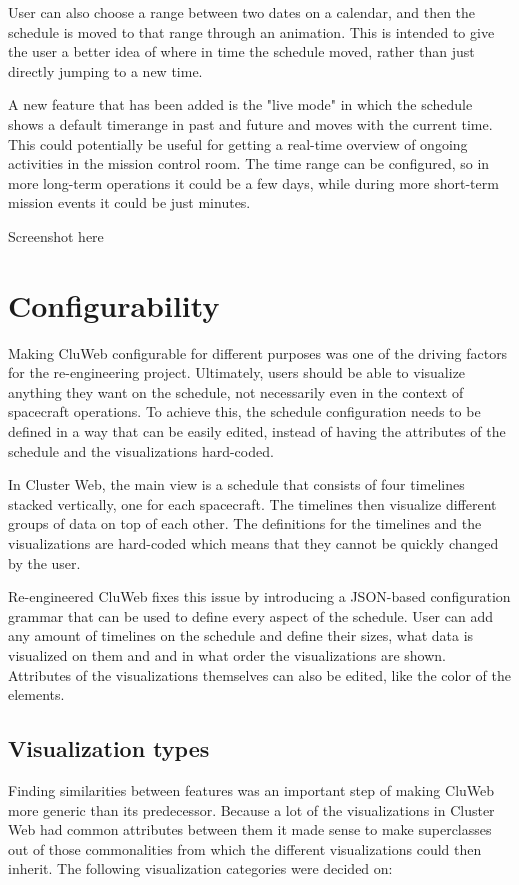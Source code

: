 User can also choose a range between two dates on a calendar, and then the schedule is moved to that range through an animation. This is intended to give the user a better idea of where in time the schedule moved, rather than just directly jumping to a new time.

 A new feature that has been added is the "live mode" in which the schedule shows a default timerange in past and future and moves with the current time. This could potentially be useful for getting a real-time overview of ongoing activities in the mission control room. The time range can be configured, so in more long-term operations it could be a few days, while during more short-term mission events it could be just minutes.
 
Screenshot here

\section{Configurability}
Making CluWeb configurable for different purposes was one of the driving factors for the re-engineering project. Ultimately, users should be able to visualize anything they want on the schedule, not necessarily even in the context of spacecraft operations. To achieve this, the schedule configuration needs to be defined in a way that can be easily edited, instead of having the attributes of the schedule and the visualizations hard-coded.

In Cluster Web, the main view is a schedule that consists of four timelines stacked vertically, one for each spacecraft. The timelines then visualize different groups of data on top of each other. The definitions for the timelines and the visualizations are hard-coded which means that they cannot be quickly changed by the user.

Re-engineered CluWeb fixes this issue by introducing a JSON-based configuration grammar that can be used to define every aspect of the schedule. User can add any amount of timelines on the schedule and define their sizes, what data is visualized on them and and in what order the visualizations are shown. Attributes of the visualizations themselves can also be edited, like the color of the elements.

\subsection{Visualization types}  \label{vis_types}
Finding similarities between features was an important step of making CluWeb more generic than its predecessor. Because a lot of the visualizations in Cluster Web had common attributes between them it made sense to make superclasses out of those commonalities from which the different visualizations could then inherit. The following visualization categories were decided on:

